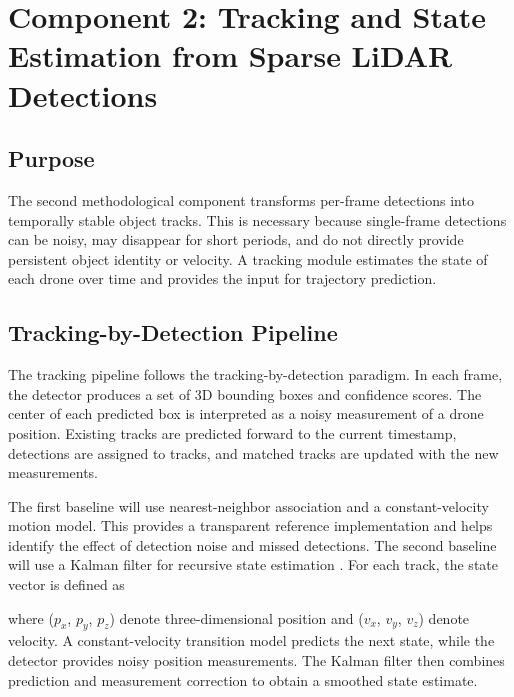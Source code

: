 \section{Component 2: Tracking and State Estimation from Sparse LiDAR Detections}

\subsection{Purpose}

The second methodological component transforms per-frame detections into temporally stable object tracks. This is necessary because single-frame detections can be noisy, may disappear for short periods, and do not directly provide persistent object identity or velocity. A tracking module estimates the state of each drone over time and provides the input for trajectory prediction.

\subsection{Tracking-by-Detection Pipeline}

The tracking pipeline follows the tracking-by-detection paradigm. In each frame, the detector produces a set of 3D bounding boxes and confidence scores. The center of each predicted box is interpreted as a noisy measurement of a drone position. Existing tracks are predicted forward to the current timestamp, detections are assigned to tracks, and matched tracks are updated with the new measurements.

The first baseline will use nearest-neighbor association and a constant-velocity motion model. This provides a transparent reference implementation and helps identify the effect of detection noise and missed detections. The second baseline will use a Kalman filter for recursive state estimation \cite{kalman1960newApproach}. For each track, the state vector is defined as
\begin{math}
[
\mathbf{x}_t =
\begin{bmatrix}
p_x & p_y & p_z & v_x & v_y & v_z
\end{bmatrix}^{\top},
]
\end{math}

where ($p_x$, $p_y$, $p_z$) denote three-dimensional position and ($v_x$, $v_y$, $v_z$) denote velocity. A constant-velocity transition model predicts the next state, while the detector provides noisy position measurements. The Kalman filter then combines prediction and measurement correction to obtain a smoothed state estimate.

